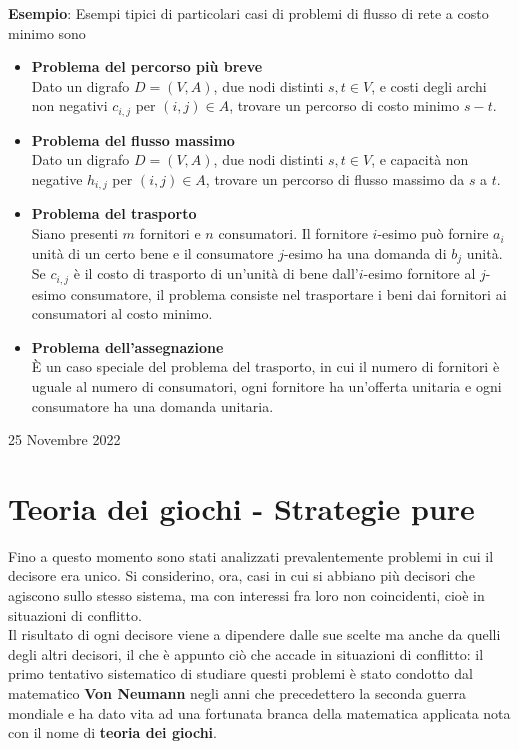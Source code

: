 \documentclass[a4paper]{extarticle}
\begin{document}
\vspace{2em}
\noindent
\textbf{Esempio}: Esempi tipici di particolari casi di problemi di flusso di rete a costo minimo sono
\begin{itemize}
    \item \textbf{Problema del percorso più breve}\\
    Dato un digrafo $D = (V, A)$, due nodi distinti $s, t \in V$, e costi degli archi non negativi $c_{i,j}$ per $(i, j) \in A$, trovare un percorso di costo minimo $s - t$.

    \item \textbf{Problema del flusso massimo}\\
    Dato un digrafo $D = (V, A)$, due nodi distinti $s, t \in V$, e capacità non negative $h_{i,j}$ per $(i, j) \in A$, trovare un percorso di flusso massimo da $s$ a $t$.

    \item \textbf{Problema del trasporto}\\
    Siano presenti $m$ fornitori e $n$ consumatori. Il fornitore $i$-esimo può fornire $a_i$ unità di un certo bene e il consumatore $j$-esimo ha una domanda di $b_j$ unità. Se $c_{i,j}$ è il costo di trasporto di un'unità di bene dall'$i$-esimo fornitore al $j$-esimo consumatore, il problema consiste nel trasportare i beni dai fornitori ai consumatori al costo minimo.

    \item \textbf{Problema dell'assegnazione}\\
    È un caso speciale del problema del trasporto, in cui il numero di fornitori è uguale al numero di consumatori, ogni fornitore ha un'offerta unitaria e ogni consumatore ha una domanda unitaria.
\end{itemize}

\newpage
\begin{center}
    25 Novembre 2022
\end{center}
\section{Teoria dei giochi - Strategie pure}
Fino a questo momento sono stati analizzati prevalentemente problemi in cui il decisore era unico. Si considerino, ora, casi in cui si abbiano più decisori che agiscono sullo stesso sistema, ma con interessi fra loro non coincidenti, cioè in situazioni di conflitto.\\
Il risultato di ogni decisore viene a dipendere dalle sue scelte ma anche da quelli degli altri decisori, il che è appunto ciò che accade in situazioni di conflitto: il primo tentativo sistematico di studiare questi problemi è stato condotto dal matematico \textbf{Von Neumann} negli anni che precedettero la seconda guerra mondiale e ha dato vita ad una fortunata branca della matematica applicata nota con il nome di \textbf{teoria dei giochi}.
\end{document}
